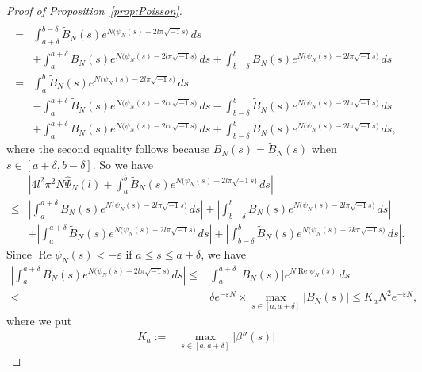 \documentclass[a4paper,dvipdfmx]{amsart}
\theoremstyle{plain}
\theoremstyle{definition}
\theoremstyle{remark}
\renewcommand{\Re}{\operatorname{Re}}
\renewcommand{\i}{\sqrt{-1}}
\numberwithin{equation}{section}
\begin{document}
\begin{proof}[Proof of Proposition~\ref{prop:Poisson}]
\begin{align*}
  \\
  =&
  \int_{a+\delta}^{b-\delta}
  \tilde{B}_N(s)e^{N\bigl(\psi_N(s)-2l\pi\i s\bigr)}\,ds
  \\
  &+
  \int_{a}^{a+\delta}
  B_N(s)e^{N\bigl(\psi_N(s)-2l\pi\i s\bigr)}\,ds
  +
  \int_{b-\delta}^{b}
  B_N(s)e^{N\bigl(\psi_N(s)-2l\pi\i s\bigr)}\,ds
  \\
  =&
  \int_{a}^{b}
  \tilde{B}_N(s)e^{N\bigl(\psi_N(s)-2l\pi\i s\bigr)}\,ds
  \\
  &-
  \int_{a}^{a+\delta}
  \tilde{B}_N(s)e^{N\bigl(\psi_N(s)-2l\pi\i s\bigr)}\,ds
  -
  \int_{b-\delta}^{b}
  \tilde{B}_N(s)e^{N\bigl(\psi_N(s)-2l\pi\i s\bigr)}\,ds
  \\
  &+
  \int_{a}^{a+\delta}
  B_N(s)e^{N\bigl(\psi_N(s)-2l\pi\i s\bigr)}\,ds
  +
  \int_{b-\delta}^{b}
  B_N(s)e^{N\bigl(\psi_N(s)-2l\pi\i s\bigr)}\,ds,
\end{align*}
where the second equality follows because $B_N(s)=\tilde{B}_N(s)$ when $s\in[a+\delta,b-\delta]$.
So we have
\begin{equation}\label{eq:Fhat_int}
\begin{split}
  &\left|
    4l^2\pi^2 N
    \hat\Psi_N(l)
    +
    \int_{a}^{b}\tilde{B}_N(s)e^{N\bigl(\psi_N(s)-2l\pi\i s\bigr)}\,ds
  \right|
  \\
  \le&
  \left|
    \int_{a}^{a+\delta}B_N(s)e^{N\bigl(\psi_N(s)-2l\pi\i s\bigr)}\,ds
  \right|
  +
  \left|
    \int_{b-\delta}^{b}B_N(s)e^{N\bigl(\psi_N(s)-2l\pi\i s\bigr)}\,ds
  \right|
  \\
  &+
  \left|
    \int_{a}^{a+\delta}\tilde{B}_N(s)e^{N\bigl(\psi_N(s)-2l\pi\i s\bigr)}\,ds
  \right|
  +
  \left|
    \int_{b-\delta}^{b}\tilde{B}_N(s)e^{N\bigl(\psi_N(s)-2k\pi\i s\bigr)}\,ds
  \right|.
\end{split}
\end{equation}
Since $\Re{\psi_N(s)}<-\varepsilon$ if $a\le s\le a+\delta$, we have
\begin{equation}\label{eq:Ka}
\begin{split}
  \left|
    \int_{a}^{a+\delta}
    B_N(s)e^{N\bigl(\psi_N(s)-2l\pi\i s\bigr)}\,ds
  \right|
  \le&
  \int_{a}^{a+\delta}
  \left|B_N(s)\right|e^{N\Re{\psi_N(s)}}\,ds
  \\
  <&
  \delta e^{-\varepsilon N}\times\max_{s\in[a,a+\delta]}|B_N(s)|
  \le
  K_aN^2e^{-\varepsilon N},
\end{split}
\end{equation}
where we put
\begin{align*}
  K_a
  :=&
  \max_{s\in[a,a+\delta]}|\beta''(s)|

\end{align*}
\end{proof}
\end{document}
